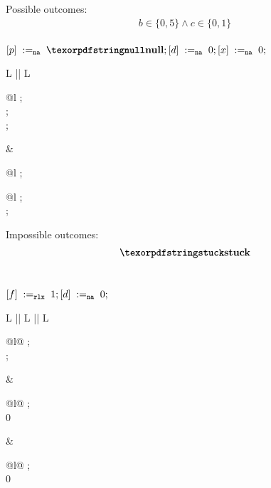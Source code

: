 \begin{minipage}[t]{0.3\linewidth}
Possible outcomes:\\
\[\begin{array}{l}
b \in \{0, 5\} \land c \in \{0, 1\} \\
\end{array}\]
\end{minipage}
%
\codePrefix
  $\writeInstParam{\na}{p}{\nullPtr}; \writeInstParam{\na}{d}{0};
   \writeInstParam{\na}{x}{0};$ \\
  \begin{tabular}{L || L}
    \begin{array}{@{}l}
      ; \\
      ; \\
      ; \\
    \end{array}
    &
    \begin{array}{@{}l}
     ; \\
      \begin{array}{@{}l}
        {; \\
         }
        {; } \\
      \end{array}
    \end{array}

  \end{tabular}
\codePostfix
\litmusTestEnd

\begin{minipage}[t]{0.2\linewidth}
Impossible outcomes:\\
\[\begin{array}{l}
\kw{stuck}
\end{array}\]\\
\end{minipage}
%
\codePrefix
  $[f] \;:=_{\mathtt{rlx}}\;1; [d] \;:=_{\mathtt{na}}\;0;$ \\
  \begin{tabular}{L || L || L}
    \begin{array}{@{}l@{}}
      ; \\
      ; \\
    \end{array}
    &
    \begin{array}{@{}l@{}}
      ; \\
      {}
      {0}
    \end{array}
    &
    \begin{array}{@{}l@{}}
      ; \\
      {}
      {0}
    \end{array}
  \end{tabular}
\codePostfix
\litmusTestEnd

